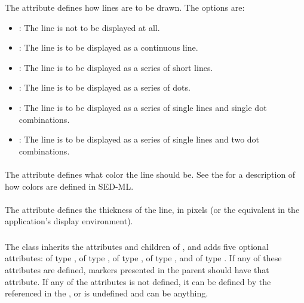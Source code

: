 The  attribute defines how lines are to be drawn.  The options are:

\begin{itemize}
        \item \textbf{}: The line is not to be displayed at all.
        \item \textbf{}: The line is to be displayed as a continuous line.
        \item \textbf{}: The line is to be displayed as a series of short lines.
        \item \textbf{}: The line is to be displayed as a series of dots.
        \item \textbf{}: The line is to be displayed as a series of single lines and single dot combinations.
        \item \textbf{}: The line is to be displayed as a series of single lines and two dot combinations.
\end{itemize}

\paragraph*{}

The  attribute defines what color the line should be.  See the \SedColor for a description of how colors are defined in SED-ML.

\paragraph*{}

The  attribute defines the thickness of the line, in pixels (or the equivalent in the application's display environment).


\subsubsection{}
\label{class:marker}

The \Marker class inherits the attributes and children of \SedBase, and adds five optional attributes:  of type \MarkerType,  of type ,  of type \SedColor,  of type \SedColor, and  of type .  If any of these attributes are defined, markers presented in the parent \Style should have that attribute.  If any of the attributes is not defined, it can be defined by the \Style referenced in the , or is undefined and can be anything.

